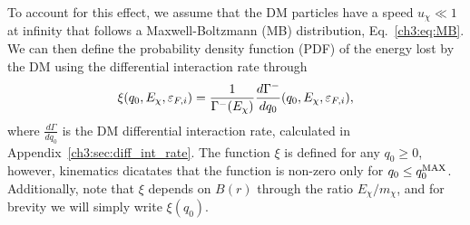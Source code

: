 To account for this effect, we assume that the DM particles have a speed $u_\chi\ll 1$ at infinity that follows a Maxwell-Boltzmann (MB) distribution, Eq.~\ref{ch3:eq:MB}. 
We can then define the probability density function (PDF) of the energy lost by the DM using the differential interaction rate through
\begin{equation}
\xi(q_0,E_\chi,\varepsilon_{F,i}) = \frac{1}{\Gamma^{-}(E_\chi)}\frac{d\Gamma^{-}}{dq_0}(q_0,E_\chi,\varepsilon_{F,i}),\label{ch3:eq:normintrate}
\end{equation}
where $\frac{d\Gamma}{dq_0}$ is the DM differential interaction rate, calculated in Appendix~\ref{ch3:sec:diff_int_rate}. 
The function $\xi$ is defined for any $q_0\ge 0$, however, kinematics dicatates that the function is non-zero only for $q_0\le q_0^{\rm MAX}$. Additionally, note that $\xi$ depends on $B(r)$ through the ratio $E_\chi/m_\chi$, and for brevity we will simply write $\xi(q_0)$.



